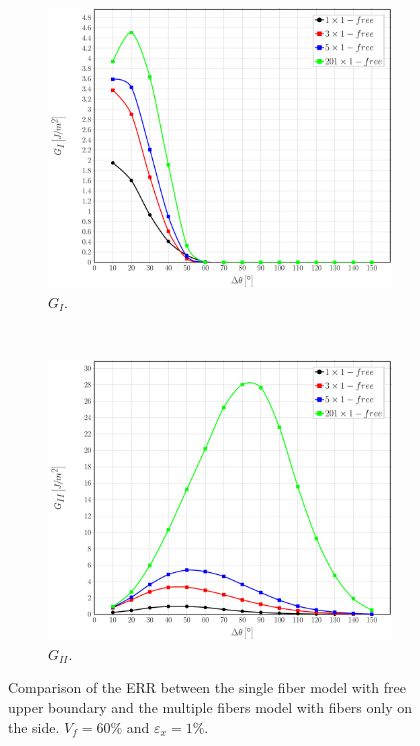 \documentclass[review]{elsarticle}
\begin{document}
\begin{figure}[!h]
\centering
    \begin{subfigure}[b]{0.475\textwidth}
        \includegraphics[width=\textwidth]{comparefreesidefibers-vf60-GI.pdf}
        \caption{$G_{I}$.}\label{subfig:comparisonfree60MI}
    \end{subfigure} ~
    \begin{subfigure}[b]{0.475\textwidth}
        \includegraphics[width=\textwidth]{comparefreesidefibers-vf60-GII.pdf}
        \caption{$G_{II}$.}\label{subfig:comparisonfree60MII}
    \end{subfigure}

\caption{Comparison of the ERR between the single fiber model with free upper boundary and the multiple fibers model with fibers only on the side. $V_{f}=60\%$ and $\varepsilon_{x}=1\%$.}\label{fig:comparisonfree}
\end{figure}
\end{document}
